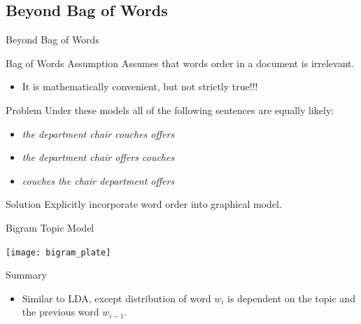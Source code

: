\documentclass[10pt, svgnames]{beamer}
\begin{document}
\subsection{Beyond Bag of Words}
\begin{frame}{Beyond Bag of Words}
	\begin{block}{Bag of Words Assumption}
		Assumes that words order in a document is irrelevant. 
		\begin{itemize}
			\item It is mathematically convenient, but not strictly true!!!
		\end{itemize}
	\end{block}
	\begin{block}{Problem}
		Under these models all of the following sentences are equally likely:
		\begin{itemize}
			\item \textit{the department chair couches offers}
			\item \textit{the department chair offers couches}
			\item \textit{couches the chair department offers}
		\end{itemize}
	\end{block}
	\begin{block}{Solution}
		Explicitly incorporate word order into graphical model.
	\end{block}
\end{frame}
\begin{frame}{Bigram Topic Model \cite{btm}}
	\begin{minipage}{0.55\linewidth}
			\begin{center}
			  \texttt{[image: bigram\_plate]}
			\end{center}
	\end{minipage}
	\begin{minipage}{0.40\linewidth}
	\begin{block}{Summary}
		\begin{itemize}
			\item Similar to LDA, except distribution of word $w_i$ is dependent on the
				topic and the previous word $w_{i-1}$.
		\end{itemize}
	\end{block}
\end{minipage}
\end{frame}
\end{document}

